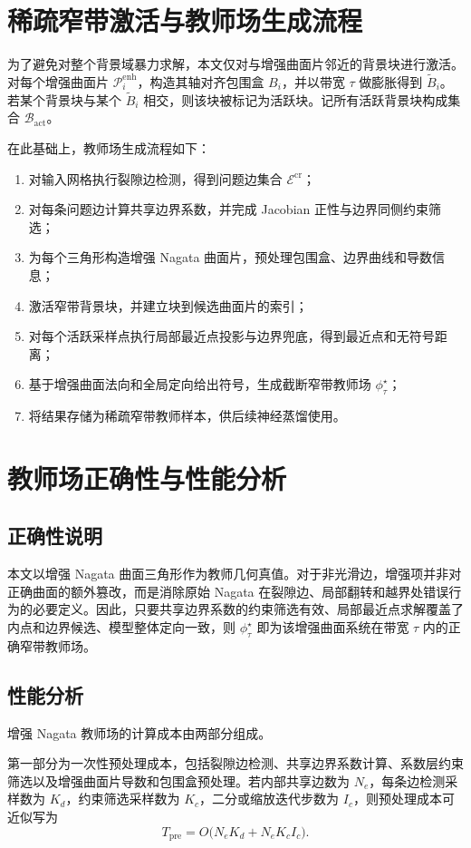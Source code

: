 \documentclass[12pt,oneside]{ctexbook}
\begin{document}
\section{稀疏窄带激活与教师场生成流程}
为了避免对整个背景域暴力求解，本文仅对与增强曲面片邻近的背景块进行激活。对每个增强曲面片 $\mathcal P_i^{\mathrm{enh}}$，构造其轴对齐包围盒 $B_i$，并以带宽 $\tau$ 做膨胀得到 $\widetilde B_i$。若某个背景块与某个 $\widetilde B_i$ 相交，则该块被标记为活跃块。记所有活跃背景块构成集合 $\mathcal B_{\mathrm{act}}$。

在此基础上，教师场生成流程如下：
\begin{enumerate}[label=\arabic*)]
  \item 对输入网格执行裂隙边检测，得到问题边集合 $\mathcal E^{\mathrm{cr}}$；
  \item 对每条问题边计算共享边界系数，并完成 Jacobian 正性与边界同侧约束筛选；
  \item 为每个三角形构造增强 Nagata 曲面片，预处理包围盒、边界曲线和导数信息；
  \item 激活窄带背景块，并建立块到候选曲面片的索引；
  \item 对每个活跃采样点执行局部最近点投影与边界兜底，得到最近点和无符号距离；
  \item 基于增强曲面法向和全局定向给出符号，生成截断窄带教师场 $\phi^\star_\tau$；
  \item 将结果存储为稀疏窄带教师样本，供后续神经蒸馏使用。
\end{enumerate}

\section{教师场正确性与性能分析}
\subsection{正确性说明}
本文以增强 Nagata 曲面三角形作为教师几何真值。对于非光滑边，增强项并非对正确曲面的额外篡改，而是消除原始 Nagata 在裂隙边、局部翻转和越界处错误行为的必要定义。因此，只要共享边界系数的约束筛选有效、局部最近点求解覆盖了内点和边界候选、模型整体定向一致，则 $\phi^\star_\tau$ 即为该增强曲面系统在带宽 $\tau$ 内的正确窄带教师场。

\subsection{性能分析}
增强 Nagata 教师场的计算成本由两部分组成。

第一部分为一次性预处理成本，包括裂隙边检测、共享边界系数计算、系数层约束筛选以及增强曲面片导数和包围盒预处理。若内部共享边数为 $N_e$，每条边检测采样数为 $K_d$，约束筛选采样数为 $K_c$，二分或缩放迭代步数为 $I_c$，则预处理成本可近似写为
\[
T_{\mathrm{pre}}=O\big(N_eK_d+N_eK_cI_c\big).
\]
\end{document}
